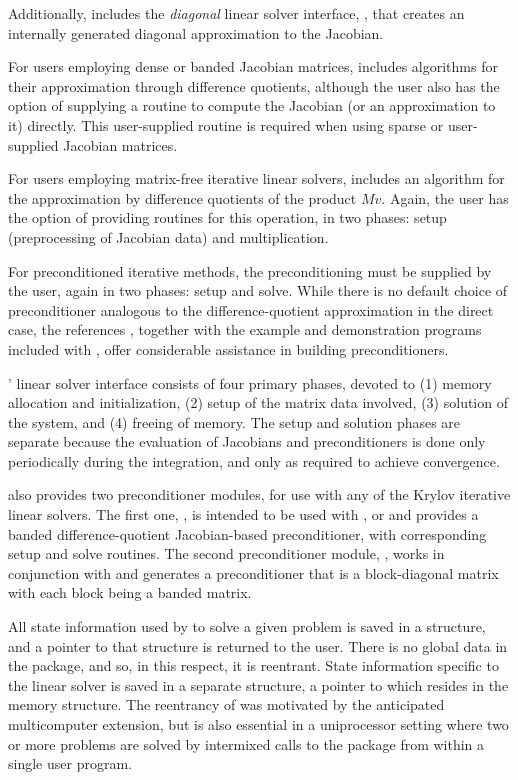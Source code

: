 Additionally, {\cvodes} includes the {\em diagonal} linear solver
interface, {\cvdiag}, that creates an internally generated diagonal
approximation to the Jacobian.

For users employing dense or banded Jacobian matrices, {\cvodes}
includes algorithms for their approximation through difference
quotients, although the user also has the option of supplying a
routine to compute the Jacobian (or an approximation to it) directly.
This user-supplied routine is required when using sparse or
user-supplied Jacobian matrices.

For users employing matrix-free iterative linear solvers,
 {\cvodes}
includes an algorithm for the approximation by difference quotients of
the product $Mv$. Again, the user has the option of providing routines
for this operation, in two phases: setup (preprocessing of Jacobian
data) and multiplication.

For preconditioned iterative methods, 
the preconditioning must be supplied by the user, again in two phases:
setup and solve.  While there is no
default choice of preconditioner analogous to the difference-quotient
approximation in the direct case, the references
\cite{BrHi:89,Byr:92}, together with the example and demonstration
programs included with {\cvodes}, offer considerable assistance in
building preconditioners.

{\cvodes}' linear solver interface consists of four primary phases,
devoted to (1) memory allocation and initialization, (2) setup of the
matrix data involved, (3) solution of the system, and (4) freeing of memory.
The setup and solution phases are separate because the evaluation of
Jacobians and preconditioners is done only periodically during the
integration, and only as required to achieve convergence.

{\cvodes} also provides two preconditioner modules, for use with any of
the Krylov iterative linear solvers. The first one, {\cvbandpre},
is intended to be used with {\nvecs}, {\nvecopenmp} or {\nvecpthreads}
and provides a banded difference-quotient Jacobian-based
preconditioner, with corresponding setup and solve routines.
The second preconditioner module, {\cvbbdpre}, works in conjunction
with {\nvecp} and generates a preconditioner that is a block-diagonal
matrix with each block being a banded matrix.

All state information used by {\cvodes} to solve a given problem is saved
in a structure, and a pointer to that structure is returned to the
user.  There is no global data in the {\cvodes} package, and so, in this
respect, it is reentrant. State information specific to the linear
solver is saved in a separate structure, a pointer to which resides in
the {\cvodes} memory structure. The reentrancy of {\cvodes} was motivated
by the anticipated multicomputer extension, but is also essential
in a uniprocessor setting where two or more problems are solved by
intermixed calls to the package from within a single user program.
